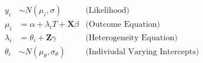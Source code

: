 \documentclass[12pt]{article}
\begin{document}
\begin{align*}
y_i &\sim N(\mu_i, \sigma) &\text{(Likelihood)} \\
\mu_i &= \alpha + \lambda_i \textit{T} + \textbf{X} \beta &\text{(Outcome Equation)}  \\ 
\lambda_i &= \theta_i + \textbf{Z} \gamma  &\text{(Heterogeneity Equation)}\\
\theta_i &\sim N(\mu_\theta, \sigma_\theta) &\text{(Indiviudal Varying Intercepts)} 
\end{align*}



\end{document}
